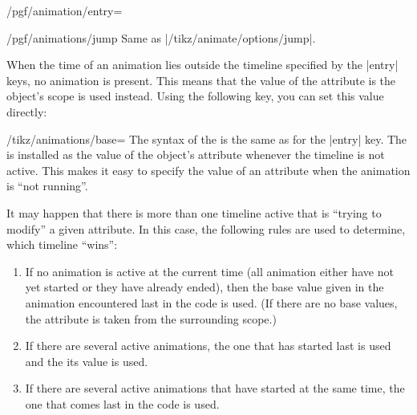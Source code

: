 \begin{key}{/pgf/animation/entry=}
    \begin{key}{/pgf/animations/jump}
        Same as |/tikz/animate/options/jump|.
\begin{codeexample}[
    preamble={\usepgfmodule{animations}},
    animation list={0.5,1,1.5,2},
]
\end{codeexample}
    \end{key}
\end{key}

When the time of an animation lies outside the timeline specified by the
|entry| keys, no animation is present. This means that the value of the
attribute is the object's scope is used instead. Using the following key, you
can set this value directly:

\begin{key}{/tikz/animations/base=}
    The syntax of the  is the same as for the |entry| key. The
     is installed as the value of the object's attribute whenever
    the timeline is not active. This makes it easy to specify the value of an
    attribute when the animation is ``not running''.
\begin{codeexample}[
    preamble={\usepgfmodule{animations}},
    animation list={-1,0,1,2,3},
]
\end{codeexample}
\end{key}

It may happen that there is more than one timeline active that is ``trying to
modify'' a given attribute. In this case, the following rules are used to
determine, which timeline ``wins'':
%
\begin{enumerate}
    \item If no animation is active at the current time (all animation either
        have not yet started or they have already ended), then the base value
        given in the animation encountered last in the code is used. (If there
        are no base values, the attribute is taken from the surrounding scope.)
    \item If there are several active animations, the one that has started last
        is used and the its value is used.
    \item If there are several active animations that have started at the same
        time, the one that comes last in the code is used.
\end{enumerate}

